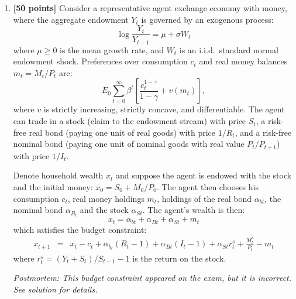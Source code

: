 \documentclass[12pt]{article}
\begin{document}
\begin{enumerate} 
\item \textbf{[50 points]} Consider a representative agent exchange economy with money, where
the aggregate endowment $Y_t$ is governed by an exogenous process:
\begin{equation}\label{output}
\log \frac{Y_{t}}{Y_{t-1}} = \mu  + \sigma W_{t}
\end{equation}
where $\mu \ge 0$ is the mean growth rate, and $W_t$ is an i.i.d.\ standard normal endowment
shock. Preferences over consumption $c_t$ and real money
balances $m_t= M_t/P_t$ are:
\[E_0 \sum_{t=0}^\infty \beta^t \left[\frac{c_t^{1-\gamma}}{1-\gamma} + v(m_t) \right],\]
where $v$ is strictly increasing, strictly concave,
and differentiable.  The agent can trade in  a
stock (claim to the endowment stream) with price $S_t$, a risk-free real bond (paying one unit of real goods) with 
price $1/R_t$, and a risk-free nominal bond (paying one unit of nominal goods with real value $P_{t}/P_{t+1}$)  with price $1/I_t$. 

Denote household wealth $x_t$ and suppose the agent is endowed with the stock and the initial
money: $x_0 = S_0 + M_0/P_0$. The agent then
chooses his consumption $c_t$, real money holdings $m_t$, holdings of
the real bond $\alpha_{bt}$, the nominal bond $\alpha_{B_t}$ and the
stock $\alpha_{St}$. The agent's wealth is then:
\[x_t =
\alpha_{bt} + \alpha_{Bt} + \alpha_{St} + m_t\] which satisfies
the budget constraint:
\begin{eqnarray*}
 x_{t+1} &=& x_t - c_t + \alpha_{b_t} (R_t-1) + \alpha_{Bt} (I_t-1) +
 \alpha_{St} r_t^s + \frac{M_t^s}{P_t} - m_t
\end{eqnarray*}\unskip
where $r_t^s=(Y_t + S_t)/S_{t-1}-1$ is the return on the stock.

\emph{Postmortem: This budget constraint appeared on the exam, but it
  is incorrect. See solution for details.}


\end{enumerate}
\end{document}

